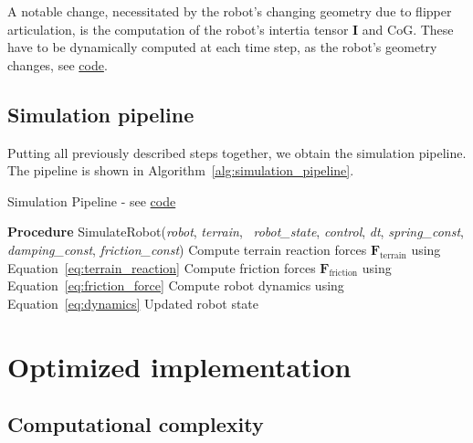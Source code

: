 \documentclass[a4paper,12pt]{article}
\begin{document}
A notable change, necessitated by the robot's changing geometry due to flipper articulation, is the computation of the robot's intertia tensor $\mathbf{I}$ and CoG. These have to be dynamically computed at each time step, as the robot's geometry changes, see \href{https://github.com/edavidk7/tracked_sim_rl/blob/a6cfea8836db27df2154c90051075746729694d0/engine/engine.py#L201}{code}.


\subsection{Simulation pipeline}
\label{sec:pipeline}

Putting all previously described steps together, we obtain the simulation pipeline. The pipeline is shown in Algorithm~\ref{alg:simulation_pipeline}.

\begin{algorithm}[H]
  \caption{Simulation Pipeline - see \href{tracked_sim_rl/blob/a6cfea8836db27df2154c90051075746729694d0/engine/engine.py}{code}}
  \label{alg:simulation_pipeline}
  \begin{algorithmic}
    \vspace{0.25cm}
    \STATE \textbf{Procedure} SimulateRobot(\textit{robot}, \textit{terrain}, \
    \textit{robot\_state}, \textit{control}, \textit{dt}, \textit{spring\_const}, \textit{damping\_const}, \textit{friction\_const})
        \STATE Compute terrain reaction forces $\mathbf{F}_{\text{terrain}}$ using Equation~\ref{eq:terrain_reaction}
        \STATE Compute friction forces $\mathbf{F}_{\text{friction}}$ using Equation~\ref{eq:friction_force}
        \STATE Compute robot dynamics using Equation~\ref{eq:dynamics}
        \RETURN Updated robot state
    \vspace{0.25cm}
    \end{algorithmic}

  \end{algorithm}

\clearpage
\section{Optimized implementation}
\label{sec:opt-impl}

\subsection{Computational complexity}
\end{document}
